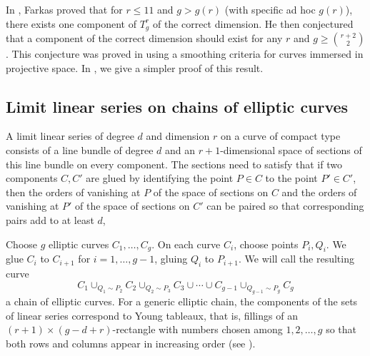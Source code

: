 \documentclass[11pt]{amsart}
\theoremstyle{definition}
\theoremstyle{definition}
\begin{document}
In \cite{F}, Farkas proved that for $r\le 11$ and  $g> g(r)$ (with specific ad hoc $g(r)$), there exists one component of $T^r_g$ of the correct dimension.
He then conjectured that a component of the correct dimension should exist for any $r$ and $g\ge {r+2\choose 2}$.
This conjecture was proved in \cite{Benzo} using a smoothing criteria for curves immersed in projective space.
In , we give  a simpler proof of this result.

\subsection{Limit linear series on chains of elliptic curves}
A limit linear series of degree $d$ and dimension $r$ on a curve of compact type consists of a line bundle of degree $d$ and an $r+1$-dimensional space of sections of this line bundle on every component.
The sections need to satisfy that if two components $C, C'$ are glued by identifying the point $P\in C$ to the point $P'\in C'$, 
then the orders of vanishing at $P$ of the space of sections on $C$ and the orders of vanishing at $P'$ of the space of sections on $C'$ can be paired so that corresponding pairs  add to at least $d$,

Choose $g$ elliptic curves $C_1,\dots, C_g$.
On each  curve $C_i$, choose points $P_i, Q_i$.
We glue $C_i$ to $C_{i+1}$ for $i=1,\dots, g-1$, gluing $Q_i$ to $P_{i+1}$.
We will call the resulting curve \[C_1 \cup_{Q_1\sim P_2} C_2 \cup_{Q_2 \sim P_3} C_3\cup\cdots\cup C_{g-1} \cup_{Q_{g-1}\sim P_g} C_g\] a chain of elliptic curves.
For a generic elliptic chain, the components of the sets of linear series correspond to Young tableaux, 
that is, fillings of an $(r+1)\times (g-d+r)$-rectangle with numbers chosen among $1,2,\dots, g$ so that both rows and columns appear in increasing order (see \cite{LT}).
 
\end{document}
